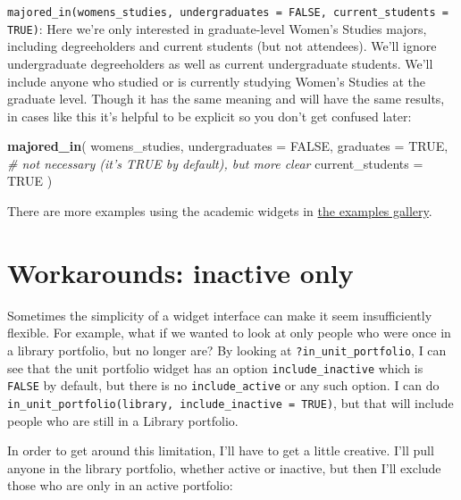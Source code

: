 \documentclass[]{book}
\newenvironment{Shaded}{\begin{snugshade}}{\end{snugshade}}
\newcommand{\CommentTok}[1]{\textcolor[rgb]{0.56,0.35,0.01}{\textit{#1}}}
\newcommand{\DataTypeTok}[1]{\textcolor[rgb]{0.13,0.29,0.53}{#1}}
\newcommand{\KeywordTok}[1]{\textcolor[rgb]{0.13,0.29,0.53}{\textbf{#1}}}
\newcommand{\NormalTok}[1]{#1}
\newcommand{\OtherTok}[1]{\textcolor[rgb]{0.56,0.35,0.01}{#1}}
\begin{document}
\texttt{majored\_in(womens\_studies,\ undergraduates\ =\ FALSE,\ current\_students\ =\ TRUE)}: Here we're only interested in graduate-level Women's Studies majors, including degreeholders and current students (but not attendees). We'll ignore undergraduate degreeholders as well as current undergraduate students. We'll include anyone who studied or is currently studying Women's Studies at the graduate level. Though it has the same meaning and will have the same results, in cases like this it's helpful to be explicit so you don't get confused later:

\begin{Shaded}
\begin{Highlighting}[]
\KeywordTok{majored_in}\NormalTok{(}
\NormalTok{    womens_studies,}
    \DataTypeTok{undergraduates =} \OtherTok{FALSE}\NormalTok{,}
    \DataTypeTok{graduates =} \OtherTok{TRUE}\NormalTok{, }\CommentTok{# not necessary (it's TRUE by default), but more clear}
    \DataTypeTok{current_students =} \OtherTok{TRUE}
\NormalTok{) }
\end{Highlighting}
\end{Shaded}

There are more examples using the academic widgets in \protect\hyperlink{ex-academic}{the examples gallery}.

\hypertarget{workarounds-inactive-only}{%
\section{Workarounds: inactive only}\label{workarounds-inactive-only}}

Sometimes the simplicity of a widget interface can make it seem insufficiently flexible. For example, what if we wanted to look at only people who were once in a library portfolio, but no longer are? By looking at \texttt{?in\_unit\_portfolio}, I can see that the unit portfolio widget has an option \texttt{include\_inactive} which is \texttt{FALSE} by default, but there is no \texttt{include\_active} or any such option. I can do \texttt{in\_unit\_portfolio(library,\ include\_inactive\ =\ TRUE)}, but that will include people who are still in a Library portfolio.

In order to get around this limitation, I'll have to get a little creative. I'll pull anyone in the library portfolio, whether active or inactive, but then I'll exclude those who are only in an active portfolio:
\end{document}
